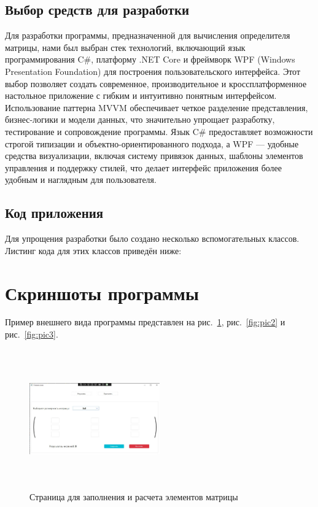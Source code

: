 \documentclass[12pt,a4paper]{scrartcl}
\begin{document}
\subsection{Выбор средств для разработки}
\label{sec:exp:selection}
Для разработки программы, предназначенной для вычисления определителя матрицы, нами был выбран стек технологий, включающий язык программирования C#, платформу .NET Core и фреймворк WPF (Windows Presentation Foundation) для построения пользовательского интерфейса. Этот выбор позволяет создать современное, производительное и кроссплатформенное настольное приложение с гибким и интуитивно понятным интерфейсом. Использование паттерна MVVM обеспечивает четкое разделение представления, бизнес-логики и модели данных, что значительно упрощает разработку, тестирование и сопровождение программы. Язык C# предоставляет возможности строгой типизации и объектно-ориентированного подхода, а WPF — удобные средства визуализации, включая систему привязок данных, шаблоны элементов управления и поддержку стилей, что делает интерфейс приложения более удобным и наглядным для пользователя.

\subsection{Код приложения}
\label{sec:exp:code}
Для упрощения разработки было создано несколько вспомогательных классов. Листинг кода для этих классов приведён ниже:







\section{Скриншоты программы}
\label{sec:program-shots}

Пример внешнего вида программы представлен на рис.~\ref{fig:pic1}, рис.~\ref{fig:pic2} и рис.~\ref{fig:pic3}.

\begin{figure}[H]
	\centering
	\includegraphics[width=0.5\textwidth,height=6cm,keepaspectratio]{./assets/pic1.jpeg}
	\caption{Страница для заполнения и расчета элементов матрицы}
	\label{fig:pic1}
\end{figure}
\end{document}
